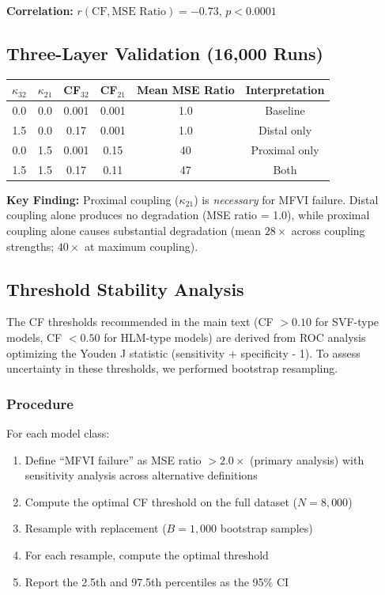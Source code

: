 \documentclass[10pt]{article} %
\theoremstyle{plain}
\theoremstyle{definition}
\begin{document}
\textbf{Correlation:} $r(\text{CF}, \text{MSE Ratio}) = -0.73$, $p < 0.0001$

\subsection{Three-Layer Validation (16,000 Runs)}

\begin{center}
\begin{tabular}{cccccc}
\toprule
$\kappa_{32}$ & $\kappa_{21}$ & CF$_{32}$ & CF$_{21}$ & Mean MSE Ratio & Interpretation \\
\midrule
0.0 & 0.0 & 0.001 & 0.001 & 1.0 & Baseline \\
1.5 & 0.0 & 0.17 & 0.001 & 1.0 & Distal only \\
0.0 & 1.5 & 0.001 & 0.15 & 40 & Proximal only \\
1.5 & 1.5 & 0.17 & 0.11 & 47 & Both \\
\bottomrule
\end{tabular}
\end{center}

\textbf{Key Finding:} Proximal coupling ($\kappa_{21}$) is \emph{necessary} for MFVI failure. Distal coupling alone produces no degradation (MSE ratio = 1.0), while proximal coupling alone causes substantial degradation (mean $28\times$ across coupling strengths; $40\times$ at maximum coupling).

\subsection{Threshold Stability Analysis}
\label{sec:threshold_stability}

The CF thresholds recommended in the main text (CF $> 0.10$ for SVF-type models, CF $< 0.50$ for HLM-type models) are derived from ROC analysis optimizing the Youden J statistic (sensitivity + specificity - 1). To assess uncertainty in these thresholds, we performed bootstrap resampling.

\subsubsection{Procedure}

For each model class:
\begin{enumerate}
\item Define ``MFVI failure'' as MSE ratio $> 2.0\times$ (primary analysis) with sensitivity analysis across alternative definitions
\item Compute the optimal CF threshold on the full dataset ($N = 8{,}000$)
\item Resample with replacement ($B = 1{,}000$ bootstrap samples)
\item For each resample, compute the optimal threshold
\item Report the 2.5th and 97.5th percentiles as the 95\% CI
\end{enumerate}
\end{document}

